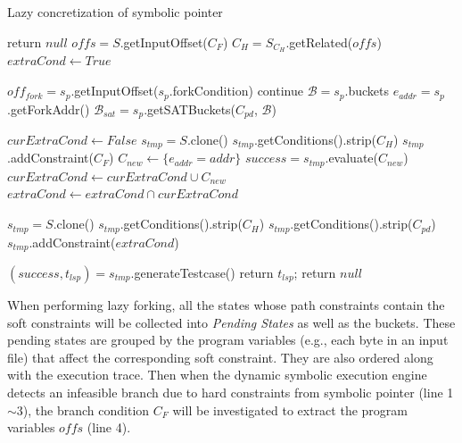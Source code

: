 \begin{algorithm}
 \LinesNumbered
  \caption{Lazy concretization of symbolic pointer}
  \label{LCSP}
  {
  	return $null$\;
  }
  $offs = S$.getInputOffset($C_F$)\;
  $C_H = S_{C_H}$.getRelated($offs$)\;
  $extraCond\leftarrow True$\;
  {
  	$off_{fork} = s_p$.getInputOffset($s_p$.forkCondition)\;
  	{continue\;}
  	$\mathcal{B}=s_p$.buckets\;
  	$e_{addr} = s_p$.getForkAddr()\;
  	$\mathcal{B}_{sat}=s_p$.getSATBuckets($C_{pd}$, $\mathcal{B}$)\;
  	
  	$curExtraCond\leftarrow False$\;
  	{
      $s_{tmp} = S$.clone()\;
      $s_{tmp}$.getConditions().strip($C_H$)\;
      $s_{tmp}$.addConstraint($C_F$)\;
      $C_{new}\leftarrow \{e_{addr}=addr\}$\;
      $success = s_{tmp}$.evaluate($C_{new}$)\;
      {$curExtraCond\leftarrow curExtraCond\cup C_{new}$\;}
  	}
  	$extraCond\leftarrow extraCond\cap curExtraCond$\;
  }
  
  $s_{tmp} = S$.clone()\;
  $s_{tmp}$.getConditions().strip($C_H$)\;
  $s_{tmp}$.getConditions().strip($C_{pd}$)\;
  $s_{tmp}$.addConstraint($extraCond$)\;
  
  $(success, t_{lsp}) = s_{tmp}$.generateTestcase()\;
  {
    return $t_{lsp}$;
  }
  return $null$\;
\end{algorithm}

When performing lazy forking, all the states whose path constraints 
contain the soft constraints will be collected into \emph{Pending States}
as well as the buckets. 
These pending states are grouped by the program variables (e.g., each 
byte in an input file) that affect the corresponding soft constraint. 
They are also ordered along with the execution trace.
Then when the dynamic symbolic execution engine detects an infeasible 
branch due to hard constraints from symbolic pointer (line 1$\sim$3), 
the branch condition $C_F$ will be 
investigated to extract the program variables $offs$ (line 4).




